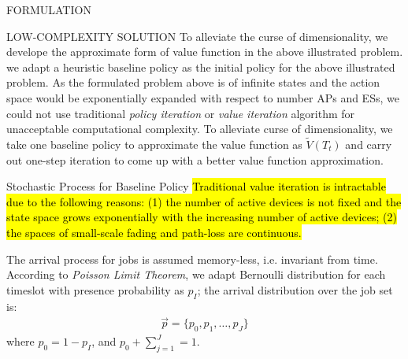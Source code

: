 \documentclass[10pt, conference, letterpaper]{IEEEtran}
\begin{document}
\begin{section}{FORMULATION}
    \end{section}

    \begin{section}{LOW-COMPLEXITY SOLUTION}
        \label{sec:algorithm}
        To alleviate the curse of dimensionality, we develope the approximate form of value function in the above illustrated problem. we adapt a heuristic baseline policy as the initial policy for the above illustrated problem.
        As the formulated problem above is of infinite states and the action space would be exponentially expanded with respect to number APs and ESs, we could not use traditional \emph{policy iteration} or \emph{value iteration} algorithm \cite{sutton1998introduction} for unacceptable computational complexity. To alleviate curse of dimensionality, we take one baseline policy to approximate the value function as $\tilde{V}(T_t)$ and carry out one-step iteration to come up with a better value function approximation.

        \begin{subsection}{Stochastic Process for Baseline Policy}
            \hl{Traditional value iteration is intractable due to the following reasons: (1) the number of active devices is not fixed and the state space grows exponentially with the increasing number of active devices; (2) the spaces of small-scale fading and path-loss are continuous.}

            The arrival process for jobs is assumed memory-less, i.e. invariant from time. According to \emph{Poisson Limit Theorem}, we adapt Bernoulli distribution for each timeslot with presence probability as $p_I$; the arrival distribution over the job set is:
            \begin{align*}
                \vec{p} = \{ p_0, p_1,\dots,p_J \}
            \end{align*}
            where $p_0=1-p_I$, and $p_0+\sum_{j=1}^{J}=1$.


\end{subsection}
\end{section}
\end{document}
